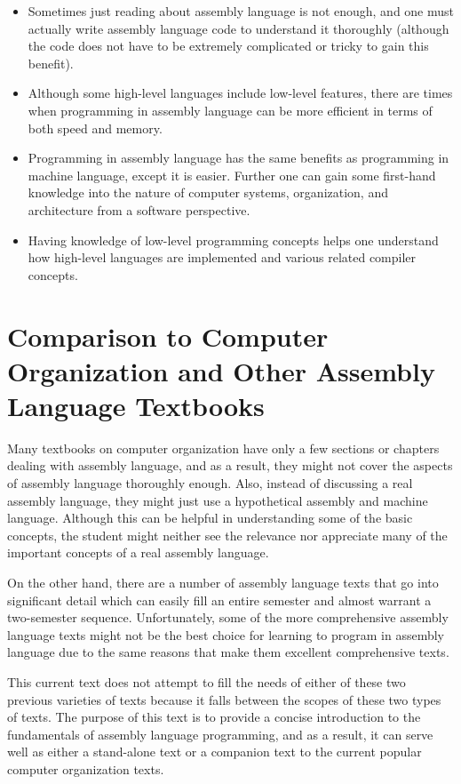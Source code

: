 \documentclass[10pt]{article}
\begin{document}
\begin{itemize}
  \item Sometimes just reading about assembly language is not enough, and one must actually write assembly language code to understand it thoroughly (although the code does not have to be extremely complicated or tricky to gain this benefit).
  \item Although some high-level languages include low-level features, there are times when programming in assembly language can be more efficient in terms of both speed and memory.
  \item Programming in assembly language has the same benefits as programming in machine language, except it is easier. Further one can gain some first-hand\\
knowledge into the nature of computer systems, organization, and architecture from a software perspective.
  \item Having knowledge of low-level programming concepts helps one understand how high-level languages are implemented and various related compiler concepts.
\end{itemize}

\section*{Comparison to Computer Organization and Other Assembly Language Textbooks}
Many textbooks on computer organization have only a few sections or chapters dealing with assembly language, and as a result, they might not cover the aspects of assembly language thoroughly enough. Also, instead of discussing a real assembly language, they might just use a hypothetical assembly and machine language. Although this can be helpful in understanding some of the basic concepts, the student might neither see the relevance nor appreciate many of the important concepts of a real assembly language.

On the other hand, there are a number of assembly language texts that go into significant detail which can easily fill an entire semester and almost warrant a two-semester sequence. Unfortunately, some of the more comprehensive assembly language texts might not be the best choice for learning to program in assembly language due to the same reasons that make them excellent comprehensive texts.

This current text does not attempt to fill the needs of either of these two previous varieties of texts because it falls between the scopes of these two types of texts. The purpose of this text is to provide a concise introduction to the fundamentals of assembly language programming, and as a result, it can serve well as either a stand-alone text or a companion text to the current popular computer organization texts.
\end{document}
